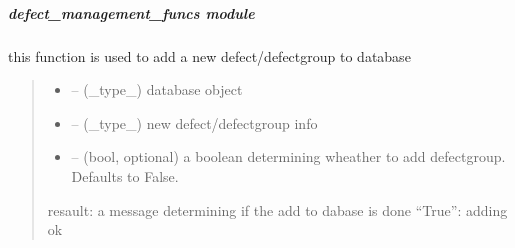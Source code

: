 \documentclass[letterpaper,10pt,english]{sphinxmanual}
\begin{document}
\sphinxstepscope


\subparagraph{defect\_management\_funcs module}
\label{\detokenize{setting/backend/defect_management_funcs:module-oxin.backend.defect_management_funcs}}\label{\detokenize{setting/backend/defect_management_funcs:defect-management-funcs-module}}\label{\detokenize{setting/backend/defect_management_funcs::doc}}

\begin{savenotes}\begin{fulllineitems}
\label{\detokenize{setting/backend/defect_management_funcs:oxin.backend.defect_management_funcs.add_new_defect_to_db}}
\pysigstartsignatures
{}
\pysigstopsignatures
\sphinxAtStartPar
this function is used to add a new defect/defect\sphinxhyphen{}group to database
\begin{quote}\begin{description}
\begin{itemize}
\item {} 
\sphinxAtStartPar
{} – (\_type\_) database object

\item {} 
\sphinxAtStartPar
{} – (\_type\_) new defect/defect\sphinxhyphen{}group info

\item {} 
\sphinxAtStartPar
{} – (bool, optional) a boolean determining wheather to add defect\sphinxhyphen{}group. Defaults to False.

\end{itemize}

\sphinxAtStartPar
resault: a message determining if the add to dabase is done “True”: adding ok

\end{description}\end{quote}

\end{fulllineitems}\end{savenotes}
\end{document}

